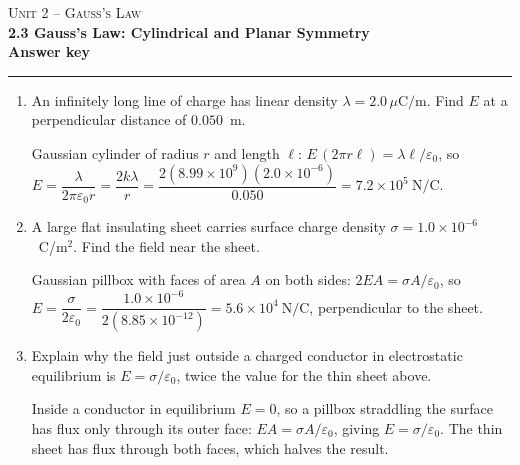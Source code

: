 \documentclass[11pt,letterpaper]{article}
\begin{document}
{\small\textsc{Unit 2 -- Gauss's Law}}\\[2pt]{\Large\bfseries 2.3 Gauss's Law: Cylindrical and Planar Symmetry}\\[8pt]\textbf{Answer key}\\[4pt]\hrule\vspace{10pt}{\small\itshape Placeholder worksheet for the site prototype. Free for classroom use.}\vspace{6pt}
\begin{enumerate}[leftmargin=*,itemsep=10pt]
\item An infinitely long line of charge has linear density $\lambda = 2.0\,\mu\text{C/m}$. Find $E$ at a perpendicular distance of $0.050$~m.
\begin{answer}Gaussian cylinder of radius $r$ and length $\ell$: $E\,(2\pi r\ell) = \lambda\ell/\varepsilon_0$, so $E = \dfrac{\lambda}{2\pi\varepsilon_0 r} = \dfrac{2k\lambda}{r} = \dfrac{2(8.99\times10^{9})(2.0\times10^{-6})}{0.050} = 7.2\times10^{5}\ \text{N/C}$.\end{answer}
\item A large flat insulating sheet carries surface charge density $\sigma = 1.0\times10^{-6}$~C/m$^2$. Find the field near the sheet.
\begin{answer}Gaussian pillbox with faces of area $A$ on both sides: $2EA = \sigma A/\varepsilon_0$, so $E = \dfrac{\sigma}{2\varepsilon_0} = \dfrac{1.0\times10^{-6}}{2(8.85\times10^{-12})} = 5.6\times10^{4}\ \text{N/C}$, perpendicular to the sheet.\end{answer}
\item Explain why the field just outside a charged conductor in electrostatic equilibrium is $E = \sigma/\varepsilon_0$, twice the value for the thin sheet above.
\begin{answer}Inside a conductor in equilibrium $E = 0$, so a pillbox straddling the surface has flux only through its outer face: $EA = \sigma A/\varepsilon_0$, giving $E = \sigma/\varepsilon_0$. The thin sheet has flux through both faces, which halves the result.\end{answer}
\end{enumerate}
\end{document}
